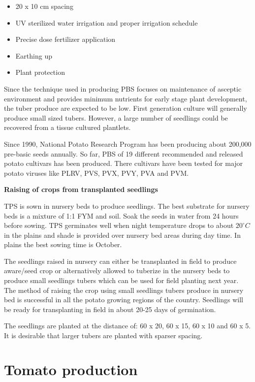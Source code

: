 \documentclass[
  openany]{book}
\providecommand{\tightlist}{%
  \setlength{\itemsep}{0pt}\setlength{\parskip}{0pt}}
\begin{document}
\begin{itemize}
  \begin{itemize}
  \tightlist
  \item
    20 x 10 cm spacing
  \item
    UV sterilized water irrigation and proper irrigation schedule
  \item
    Precise dose fertilizer application
  \item
    Earthing up
  \item
    Plant protection
  \end{itemize}
\end{itemize}

Since the technique used in producing PBS focuses on maintenance of asceptic environment and provides minimum nutrients for early stage plant development, the tuber produce are expected to be low. First generation culture will generally produce small sized tubers. However, a large number of seedlings could be recovered from a tissue cultured plantlets.

Since 1990, National Potato Research Program has been producing about 200,000 pre-basic seeds annually. So far, PBS of 19 different recommended and released potato cultivars has been produced. There cultivars have been tested for major potato viruses like PLRV, PVS, PVX, PVY, PVA and PVM.

\textbf{Raising of crops from transplanted seedlings}

TPS is sown in nursery beds to produce seedlings. The best substrate for nursery beds is a mixture of 1:1 FYM and soil. Soak the seeds in water from 24 hours before sowing. TPS germinates well when night temperature drops to about \(20^\circ C\) in the plains and shade is provided over nursery bed areas during day time. In plains the best sowing time is October.

The seedlings raised in nursery can either be transplanted in field to produce aware/seed crop or alternatively allowed to tuberize in the nursery beds to produce small seedlings tubers which can be used for field planting next year. The method of raising the crop using small seedlings tubers produce in nursery bed is successful in all the potato growing regions of the country. Seedlings will be ready for transplanting in field in about 20-25 days of germination.

The seedlings are planted at the distance of: 60 x 20, 60 x 15, 60 x 10 and 60 x 5. It is desirable that larger tubers are planted with sparser spacing.

\hypertarget{tomato-production}{%
\section{Tomato production}\label{tomato-production}}
\end{document}
